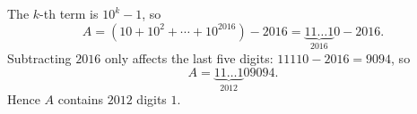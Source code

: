The $k$-th term is $10^k-1$, so
\[
A=(10+10^2+\cdots+10^{2016})-2016=\underbrace{11\ldots1}_{2016}0-2016 .
\]
Subtracting $2016$ only affects the last five digits: $11110-2016=9094$, so
\[
A=\underbrace{11\ldots1}_{2012}09094 .
\]
Hence $A$ contains $\boxed{2012}$ digits $1$.
